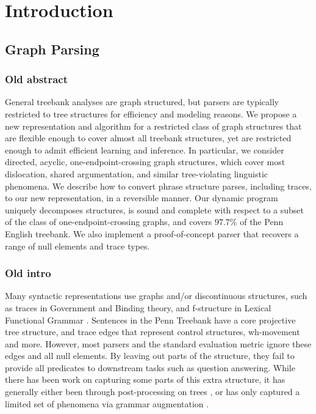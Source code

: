\chapter{Introduction}


\section{Graph Parsing}

\subsection{Old abstract}
General treebank analyses are graph structured, but parsers are typically restricted to tree structures for efficiency and modeling reasons.
We propose a new representation and algorithm for a restricted class of graph structures that are flexible enough to cover almost all treebank structures, yet are restricted enough to admit efficient learning and inference.
In particular, we consider directed, acyclic, one-endpoint-crossing graph structures, which cover most dislocation, shared argumentation, and similar tree-violating linguistic phenomena.
We describe how to convert phrase structure parses, including traces, to our new representation, in a reversible manner.
Our dynamic program uniquely decomposes structures, is sound and complete with respect to a subset of the class of one-endpoint-crossing graphs, and covers $97.7\%$ of the Penn English treebank.
We also implement a proof-of-concept parser that recovers a range of null elements and trace types.

\subsection{Old intro}

Many syntactic representations use graphs and/or discontinuous structures, such as traces in Government and Binding theory, and f-structure in Lexical Functional Grammar \cite{gb,Bresnan:1982}.
Sentences in the Penn Treebank \cite{ptb} have a core projective tree structure, and trace edges that represent control structures, wh-movement and more.
However, most parsers and the standard evaluation metric ignore these edges and all null elements.
By leaving out parts of the structure, they fail to provide all predicates to downstream tasks such as question answering.
While there has been work on capturing some parts of this extra structure, it has generally either been through post-processing on trees
\cite{Johnson:2002,Jijkoun:2003,Campbell:2004,Levy:2004,Gabbard:2006},
or has only captured a limited set of phenomena via grammar augmentation
\cite{collins:1997,dienes-dubey:2003,schmid:2006,cai-chiang-goldberg:2011}.

